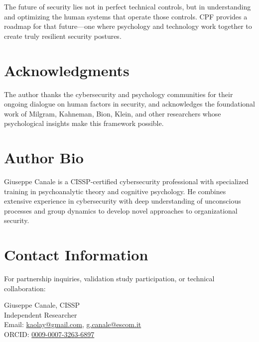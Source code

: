 \documentclass[11pt,a4paper]{article}
\begin{document}
The future of security lies not in perfect technical controls, but in understanding and optimizing the human systems that operate those controls. CPF provides a roadmap for that future—one where psychology and technology work together to create truly resilient security postures.

\section*{Acknowledgments}

The author thanks the cybersecurity and psychology communities for their ongoing dialogue on human factors in security, and acknowledges the foundational work of Milgram, Kahneman, Bion, Klein, and other researchers whose psychological insights make this framework possible.

\section*{Author Bio}

Giuseppe Canale is a CISSP-certified cybersecurity professional with specialized training in psychoanalytic theory and cognitive psychology. He combines extensive experience in cybersecurity with deep understanding of unconscious processes and group dynamics to develop novel approaches to organizational security.

\section*{Contact Information}

For partnership inquiries, validation study participation, or technical collaboration:

Giuseppe Canale, CISSP\\
Independent Researcher\\
Email: \href{mailto:kaolay@gmail.com}{kaolay@gmail.com}, \href{mailto:g.canale@escom.it}{g.canale@escom.it}\\
ORCID: \href{https://orcid.org/0009-0007-3263-6897}{0009-0007-3263-6897}
\end{document}
